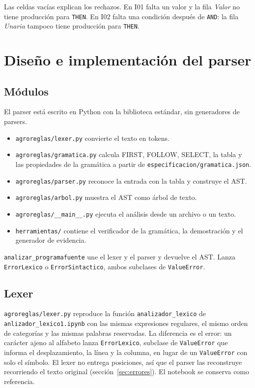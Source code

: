\documentclass[11pt,a4paper]{article}
\newcommand{\tk}[1]{\texttt{#1}}
\newcommand{\nt}[1]{\textit{#1}}
\begin{document}
Las celdas vacías explican los rechazos. En I01 falta un valor y la
fila \nt{Valor} no tiene producción para \tk{THEN}. En I02 falta
una condición después de \tk{AND}: la fila \nt{Unaria} tampoco
tiene producción para \tk{THEN}.

\section{Diseño e implementación del parser}

\subsection{Módulos}

El parser está escrito en Python con la biblioteca estándar, sin
generadores de parsers.

\begin{itemize}
  \item \texttt{agroreglas/lexer.py} convierte el texto en tokens.
  \item \texttt{agroreglas/gramatica.py} calcula FIRST, FOLLOW,
    SELECT, la tabla y las propiedades de la gramática a partir de
    \texttt{especificacion/gramatica.json}.
  \item \texttt{agroreglas/parser.py} reconoce la entrada con la
    tabla y construye el AST.
  \item \texttt{agroreglas/arbol.py} muestra el AST como árbol de texto.
  \item \texttt{agroreglas/\_\_main\_\_.py} ejecuta el análisis
    desde un archivo o un texto.
  \item \texttt{herramientas/} contiene el verificador de la
    gramática, la demostración y el generador de evidencia.
\end{itemize}

\texttt{analizar\_programafuente} une el lexer y el parser y
devuelve el AST. Lanza \texttt{ErrorLexico} o
\texttt{ErrorSintactico}, ambos subclases de \texttt{ValueError}.

\subsection{Lexer}

\texttt{agroreglas/lexer.py} reproduce la función
\texttt{analizador\_lexico} de \texttt{anlizador\_lexico1.ipynb}
con las mismas expresiones regulares, el mismo orden de categorías
y las mismas palabras reservadas. La diferencia es el error: un
carácter ajeno al alfabeto lanza \texttt{ErrorLexico}, subclase de
\texttt{ValueError} que informa el desplazamiento, la línea y la
columna, en lugar de un \texttt{ValueError} con solo el símbolo. El
lexer no entrega posiciones, así que el parser las reconstruye
recorriendo el texto original (sección~\ref{sec:errores}). El
notebook se conserva como referencia.
\end{document}
